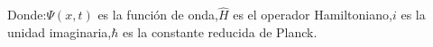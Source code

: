 \documentclass[preview]{standalone}
\begin{document}
\begin{center}
Donde:$\Psi(x, t)$ es la función de onda,$\hat{H}$ es el operador Hamiltoniano,$i$ es la unidad imaginaria,$\hbar$ es la constante reducida de Planck.
\end{center}
\end{document}
